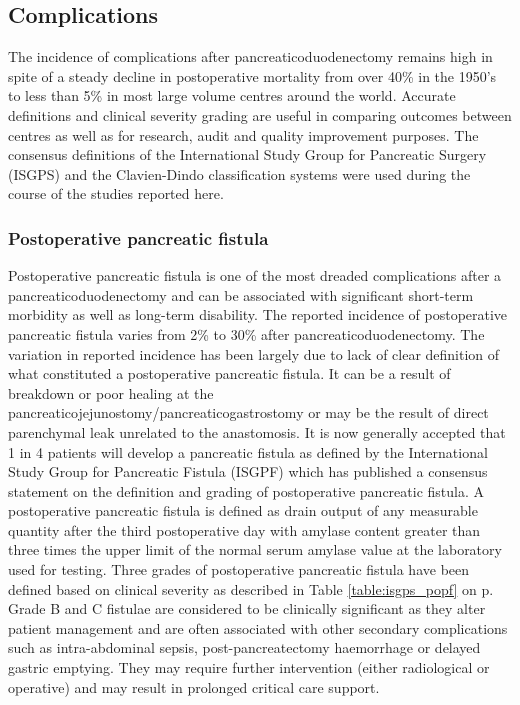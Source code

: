 \subsection{Complications}
The incidence of complications after pancreaticoduodenectomy remains high in spite of a steady decline in postoperative mortality from over 40\% in the 1950's to less than 5\% in most large volume centres around the world.\parencite{deoliveira_assessment_2006, emick_hospital_2006, yeo_six_1997, winter_1423_2006, teh_patient_2009, gouma_rates_2000} Accurate definitions and clinical severity grading are useful in comparing outcomes between centres as well as for research, audit and quality improvement purposes. The consensus definitions of the International Study Group for Pancreatic Surgery (ISGPS) and the Clavien-Dindo classification systems were used during the course of the studies reported here.


\subsubsection{Postoperative pancreatic fistula}
\label{sec:ch_intro_POPF}



Postoperative pancreatic fistula is one of the most dreaded complications after a pancreaticoduodenectomy and can be associated with significant short-term morbidity as well as long-term disability. The reported incidence of postoperative pancreatic fistula varies from 2\% to 30\% after pancreaticoduodenectomy.\parencite{yeo_six_1997,deoliveira_assessment_2006,bassi_postoperative_2005,winter_biochemical_2007,pratt_risk_2008} 
The variation in reported incidence has been largely due to lack of clear definition of what constituted a postoperative pancreatic fistula. It can be a result of breakdown or poor healing at the pancreaticojejunostomy/pancreaticogastrostomy or may be the result of direct parenchymal leak unrelated to the anastomosis. It is now generally accepted that 1 in 4 patients will develop a pancreatic fistula as defined by the International Study Group for Pancreatic Fistula (ISGPF) which has published a consensus statement on the definition and grading of postoperative pancreatic fistula.\parencite{bassi_postoperative_2005} A postoperative pancreatic fistula is defined as drain output of any measurable quantity after the third postoperative day with amylase content greater than three times the upper limit of the normal serum amylase value at the laboratory used for testing. Three grades of postoperative pancreatic fistula have been defined based on clinical severity as described in Table \ref{table:isgps_popf} on p\pageref{table:isgps_popf}. Grade B and C fistulae are considered to be clinically significant as they alter patient management and are often associated with other secondary complications such as intra-abdominal sepsis, post-pancreatectomy haemorrhage or delayed gastric emptying. They may require further intervention (either radiological or operative) and may result in prolonged critical care support.

